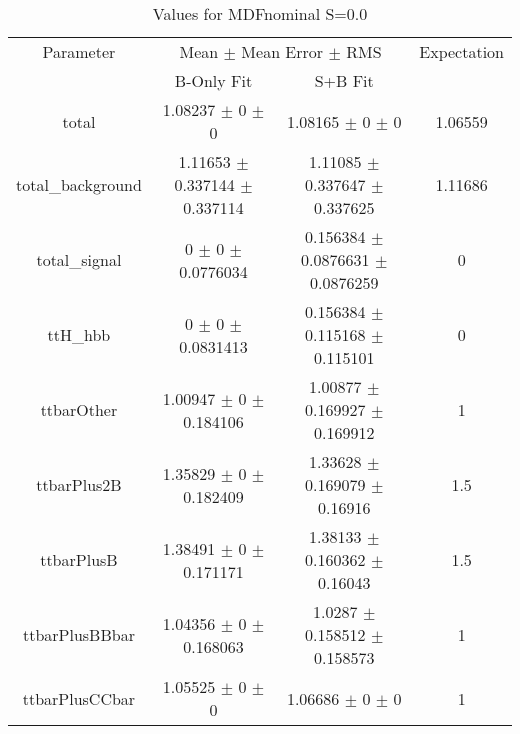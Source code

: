 \begin{table}
\centering
\caption{Values for MDFnominal S=0.0}
\begin{tabular}{cccc}
\toprule
Parameter & \multicolumn{2}{c}{Mean $\pm$ Mean Error $\pm$ RMS} & Expectation\\
 & B-Only Fit & S+B Fit & \\
\midrule
total & \num{1.08237} $\pm$ \num{0} $\pm$ \num{0} & \num{1.08165} $\pm$ \num{0} $\pm$ \num{0} & \num{1.06559}\\
total\_background & \num{1.11653} $\pm$ \num{0.337144} $\pm$ \num{0.337114} & \num{1.11085} $\pm$ \num{0.337647} $\pm$ \num{0.337625} & \num{1.11686}\\
total\_signal & \num{0} $\pm$ \num{0} $\pm$ \num{0.0776034} & \num{0.156384} $\pm$ \num{0.0876631} $\pm$ \num{0.0876259} & \num{0}\\
ttH\_hbb & \num{0} $\pm$ \num{0} $\pm$ \num{0.0831413} & \num{0.156384} $\pm$ \num{0.115168} $\pm$ \num{0.115101} & \num{0}\\
ttbarOther & \num{1.00947} $\pm$ \num{0} $\pm$ \num{0.184106} & \num{1.00877} $\pm$ \num{0.169927} $\pm$ \num{0.169912} & \num{1}\\
ttbarPlus2B & \num{1.35829} $\pm$ \num{0} $\pm$ \num{0.182409} & \num{1.33628} $\pm$ \num{0.169079} $\pm$ \num{0.16916} & \num{1.5}\\
ttbarPlusB & \num{1.38491} $\pm$ \num{0} $\pm$ \num{0.171171} & \num{1.38133} $\pm$ \num{0.160362} $\pm$ \num{0.16043} & \num{1.5}\\
ttbarPlusBBbar & \num{1.04356} $\pm$ \num{0} $\pm$ \num{0.168063} & \num{1.0287} $\pm$ \num{0.158512} $\pm$ \num{0.158573} & \num{1}\\
ttbarPlusCCbar & \num{1.05525} $\pm$ \num{0} $\pm$ \num{0} & \num{1.06686} $\pm$ \num{0} $\pm$ \num{0} & \num{1}\\
\bottomrule
\end{tabular}
\end{table}